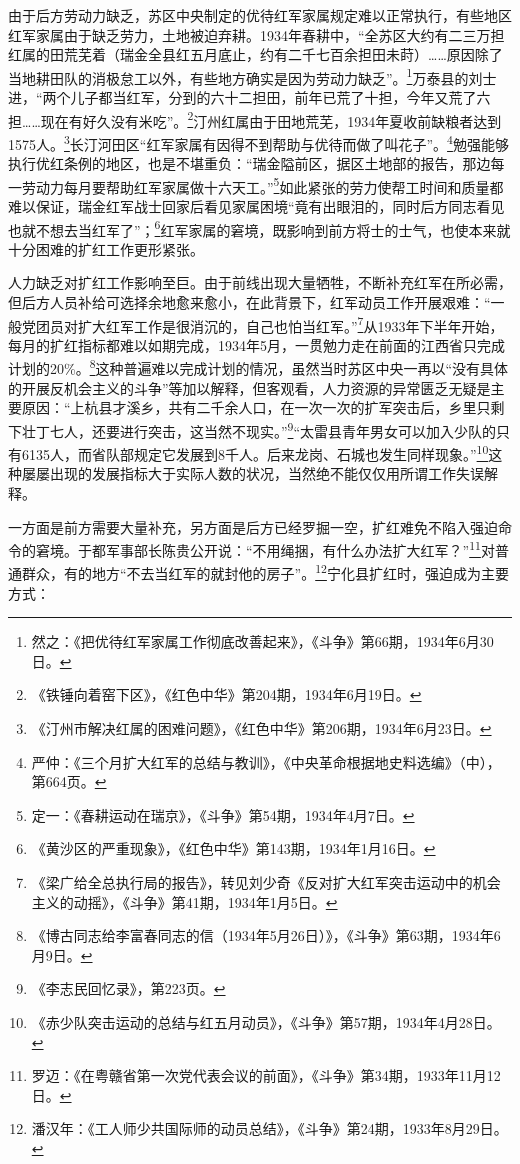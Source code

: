 由于后方劳动力缺乏，苏区中央制定的优待红军家属规定难以正常执行，有些地区红军家属由于缺乏劳力，土地被迫弃耕。1934年春耕中，“全苏区大约有二三万担红属的田荒芜着（瑞金全县红五月底止，约有二千七百余担田未莳）……原因除了当地耕田队的消极怠工以外，有些地方确实是因为劳动力缺乏”。\footnote{然之：《把优待红军家属工作彻底改善起来》，《斗争》第66期，1934年6月30日。}万泰县的刘士进，“两个儿子都当红军，分到的六十二担田，前年已荒了十担，今年又荒了六担……现在有好久没有米吃”。\footnote{《铁锤向着窑下区》，《红色中华》第204期，1934年6月19日。}汀州红属由于田地荒芜，1934年夏收前缺粮者达到1575人。\footnote{《汀州市解决红属的困难问题》，《红色中华》第206期，1934年6月23日。}长汀河田区“红军家属有因得不到帮助与优待而做了叫花子”。\footnote{严仲：《三个月扩大红军的总结与教训》，《中央革命根据地史料选编》（中），第664页。}勉强能够执行优红条例的地区，也是不堪重负：“瑞金隘前区，据区土地部的报告，那边每一劳动力每月要帮助红军家属做十六天工。”\footnote{定一：《春耕运动在瑞京》，《斗争》第54期，1934年4月7日。}如此紧张的劳力使帮工时间和质量都难以保证，瑞金红军战士回家后看见家属困境“竟有出眼泪的，同时后方同志看见也就不想去当红军了”；\footnote{《黄沙区的严重现象》，《红色中华》第143期，1934年1月16日。}红军家属的窘境，既影响到前方将士的士气，也使本来就十分困难的扩红工作更形紧张。


人力缺乏对扩红工作影响至巨。由于前线出现大量牺牲，不断补充红军在所必需，但后方人员补给可选择余地愈来愈小，在此背景下，红军动员工作开展艰难：“一般党团员对扩大红军工作是很消沉的，自己也怕当红军。”\footnote{《梁广给全总执行局的报告》，转见刘少奇《反对扩大红军突击运动中的机会主义的动摇》，《斗争》第41期，1934年1月5日。}从1933年下半年开始，每月的扩红指标都难以如期完成，1934年5月，一贯勉力走在前面的江西省只完成计划的20\%。\footnote{《博古同志给李富春同志的信（1934年5月26日）》，《斗争》第63期，1934年6月9日。}这种普遍难以完成计划的情况，虽然当时苏区中央一再以“没有具体的开展反机会主义的斗争”等加以解释，但客观看，人力资源的异常匮乏无疑是主要原因：“上杭县才溪乡，共有二千余人口，在一次一次的扩军突击后，乡里只剩下壮丁七人，还要进行突击，这当然不现实。”\footnote{《李志民回忆录》，第223页。}“太雷县青年男女可以加入少队的只有6135人，而省队部规定它发展到8千人。后来龙岗、石城也发生同样现象。”\footnote{《赤少队突击运动的总结与红五月动员》，《斗争》第57期，1934年4月28日。}这种屡屡出现的发展指标大于实际人数的状况，当然绝不能仅仅用所谓工作失误解释。


一方面是前方需要大量补充，另方面是后方已经罗掘一空，扩红难免不陷入强迫命令的窘境。于都军事部长陈贵公开说：“不用绳捆，有什么办法扩大红军？”\footnote{罗迈：《在粤赣省第一次党代表会议的前面》，《斗争》第34期，1933年11月12日。}对普通群众，有的地方“不去当红军的就封他的房子”。\footnote{潘汉年：《工人师少共国际师的动员总结》，《斗争》第24期，1933年8月29日。}宁化县扩红时，强迫成为主要方式：

